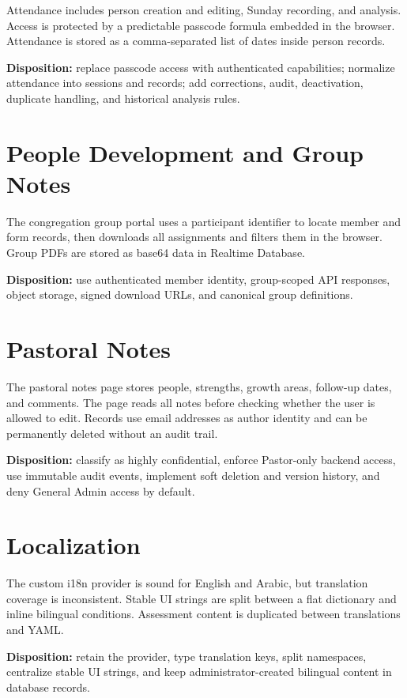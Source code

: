 \documentclass[11pt,a4paper,oneside]{report}
\begin{document}
Attendance includes person creation and editing, Sunday recording, and analysis. Access is protected by a predictable passcode formula embedded in the browser. Attendance is stored as a comma-separated list of dates inside person records.

\textbf{Disposition:} replace passcode access with authenticated capabilities; normalize attendance into sessions and records; add corrections, audit, deactivation, duplicate handling, and historical analysis rules.

\section{People Development and Group Notes}

The congregation group portal uses a participant identifier to locate member and form records, then downloads all assignments and filters them in the browser. Group PDFs are stored as base64 data in Realtime Database.

\textbf{Disposition:} use authenticated member identity, group-scoped API responses, object storage, signed download URLs, and canonical group definitions.

\section{Pastoral Notes}

The pastoral notes page stores people, strengths, growth areas, follow-up dates, and comments. The page reads all notes before checking whether the user is allowed to edit. Records use email addresses as author identity and can be permanently deleted without an audit trail.

\textbf{Disposition:} classify as highly confidential, enforce Pastor-only backend access, use immutable audit events, implement soft deletion and version history, and deny General Admin access by default.

\section{Localization}

The custom i18n provider is sound for English and Arabic, but translation coverage is inconsistent. Stable UI strings are split between a flat dictionary and inline bilingual conditions. Assessment content is duplicated between translations and YAML.

\textbf{Disposition:} retain the provider, type translation keys, split namespaces, centralize stable UI strings, and keep administrator-created bilingual content in database records.
\end{document}
